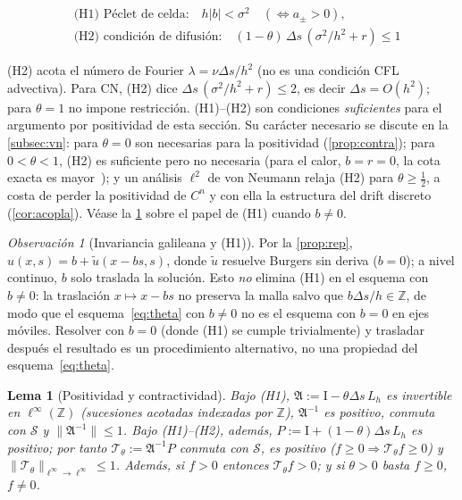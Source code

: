 \documentclass[11pt,letterpaper]{article}
\theoremstyle{plain}
\newtheorem{lema}[theorem]{Lema}
\theoremstyle{definition}
\theoremstyle{remark}
\newtheorem{observacion}[theorem]{Observación}
\numberwithin{equation}{section}
\newcommand{\Z}{\mathbb{Z}}
\newcommand{\norm}[1]{\lVert #1\rVert}
\newcommand{\Sh}{\mathcal{S}}
\newcommand{\Id}{\mathrm{I}}
\newcommand{\Top}{\mathcal{T}}
\begin{document}
	\begin{align}
		&\text{(H1) Péclet de celda:}\quad h|b|<\sigma^2\quad(\Leftrightarrow a_\pm>0),\label{eq:H1}\\
		&\text{(H2) condición de difusión:}\quad (1-\theta)\,\Delta s\,\left(\sigma^2/h^2+r\right)\le 1\label{eq:H2}
	\end{align}
	
	(H2) acota el número de Fourier \(\lambda=\nu\Delta s/h^2\) (no es una condición CFL advectiva). Para CN, (H2) dice \(\Delta s\,(\sigma^2/h^2+r)\le2\), es decir \(\Delta s=O(h^2)\); para \(\theta=1\) no impone restricción. (H1)--(H2) son condiciones \emph{suficientes} para el argumento por positividad de esta sección. Su carácter necesario se discute en la \cref{subsec:vn}: para \(\theta=0\) son necesarias para la positividad (\cref{prop:contra}); para \(0<\theta<1\), (H2) es suficiente pero no necesaria (para el calor, \(b=r=0\), la cota exacta es mayor~\cite{HigueresRoldan2023}); y un análisis \(\ell^2\) de von Neumann relaja (H2) para \(\theta\ge\frac12\), a costa de perder la positividad de \(C^n\) y con ella la estructura del drift discreto (\cref{cor:acopla}). Véase la \cref{obs:galileo} sobre el papel de (H1) cuando \(b\neq0\).
	
	\begin{observacion}[Invariancia galileana y (H1)]\label{obs:galileo}
		Por la \cref{prop:rep}, \(u(x,s)=b+\tilde u(x-bs,s)\), donde \(\tilde u\) resuelve Burgers sin deriva (\(b=0\)); a nivel continuo, \(b\) solo traslada la solución. Esto \emph{no} elimina (H1) en el esquema con \(b\neq0\): la traslación \(x\mapsto x-bs\) no preserva la malla salvo que \(b\Delta s/h\in\Z\), de modo que el esquema~\eqref{eq:theta} con \(b\neq0\) no es el esquema con \(b=0\) en ejes móviles. Resolver con \(b=0\) (donde (H1) se cumple trivialmente) y trasladar después el resultado es un procedimiento alternativo, no una propiedad del esquema~\eqref{eq:theta}.
	\end{observacion}
	
	\begin{lema}[Positividad y contractividad]\label{lema:pos}
		Bajo (H1), \(\mathfrak A:=\Id-\theta\Delta s\,L_h\) es invertible en \(\ell^\infty(\Z)\) (sucesiones acotadas indexadas por \(\Z\)), \(\mathfrak A^{-1}\) es positivo, conmuta con \(\Sh\) y \(\norm{\mathfrak A^{-1}}\le1\). Bajo (H1)--(H2), además, \(P:=\Id+(1-\theta)\Delta s\,L_h\) es positivo; por tanto \(\Top_\theta:=\mathfrak A^{-1}P\) conmuta con \(\Sh\), es positivo (\(f\ge0\Rightarrow \Top_\theta f\ge0\)) y \(\norm{\Top_\theta}_{\ell^\infty\to\ell^\infty}\le1\). Además, si \(f>0\) entonces \(\Top_\theta f>0\); y si \(\theta>0\) basta \(f\ge0\), \(f\neq0\).
	\end{lema}
	
\end{document}
